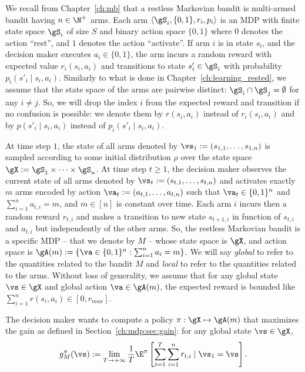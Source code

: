 We recall from Chapter~\ref{ch:mb} that a restless Markovian bandit is multi-armed bandit having $n\in\N^+$ arms.
Each arm $\langle\gS_i, \{0,1\}, r_i, p_i\rangle$ is an MDP with finite state space $\gS_i$ of size $S$ and binary action space $\{0,1\}$ where $0$ denotes the action ``rest'', and $1$ denotes the action ``activate''.
If arm $i$ is in state $s_i$, and the decision maker executes $a_i\in\{0,1\}$, the arm incurs a random reward with expected value $r_i(s_i,a_i)$ and transitions to state $s'_i\in\gS_i$ with probability $p_i(s'_i\mid s_i,a_i)$.
Similarly to what is done in Chapter~\ref{ch:learning_rested}, we assume that the state space of the arms are pairwise distinct: $\gS_i\cap\gS_j=\emptyset$ for any $i\neq j$.
So, we will drop the index $i$ from the expected reward and transition if no confusion is possible: we denote them by $r(s_i,a_i)$ instead of $r_i(s_i,a_i)$ and by $p(s'_i\mid s_i,a_i)$ instead of $p_i(s'_i\mid s_i,a_i)$.

At time step $1$, the state of all arms denoted by $\vs_1:=(s_{1,1},\dots,s_{1,n})$ is sampled according to some initial distribution $\rho$ over the state space $\gX:=\gS_1\times\dots\times\gS_n$.
At time step $t\ge1$, the decision maker observes the current state of all arms denoted by $\vs_t:=(s_{t,1},\dots,s_{t,n})$ and activates exactly $m$ arms encoded by action $\va_t:=(a_{t,1},\dots,a_{t,n})$ such that $\va_t\in\{0,1\}^n$ and $\sum_{i=1}^{n} a_{t,i}=m$, and $m\in[n]$ is constant over time.
Each arm $i$ incurs then a random reward $r_{t,i}$ and makes
a transition to new state $s_{t+1,i}$ in function of $s_{t,i}$ and $a_{t,i}$ but independently of the other arms.
So, the restless Markovian bandit is a specific MDP -- that we denote by $M$ -- whose state space is $\gX$, and action space is $\gA(m):=\{\va\in\{0,1\}^n : \sum_{i=1}^{n}a_i =m\}$.
We will say \emph{global} to refer to the quantities related to the bandit $M$ and \emph{local} to refer to the quantities related to the arms.
Without loss of generality, we assume that for any global state $\vs\in\gX$ and global action $\va\in\gA(m)$, the expected reward is bounded like $\sum_{i=1}^{n}r(s_i,a_i)\in[0,r_{max}]$.

The decision maker wants to compute a policy $\pi:\gX\mapsto\gA(m)$ that maximizes the gain as defined in Section~\ref{ch:mdp:sec:gain}: for any global state $\vs\in\gX$,
\begin{equation}
    \label{ch:restless:eq:obj}
    g^\pi_M(\vs):=\lim_{T\to+\infty}\frac1T \E^\pi\left[ \sum_{t=1}^{T} \sum_{i=1}^nr_{t,i} \mid \vs_1=\vs\right].
\end{equation}


